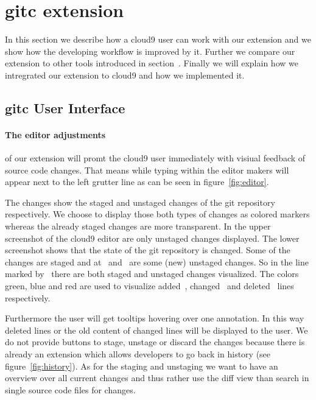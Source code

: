\section{gitc extension}
\label{sec:Extension}
In this section we describe how a cloud9 user can work with our extension and we show how the developing workflow is improved by it.
Further we compare our extension to other tools introduced in section~.
Finally we will explain how we intregrated our extension to cloud9 and how we implemented it.

\subsection{gitc User Interface}
\label{sec:gitc_ui}
\paragraph{The editor adjustments} of our extension will promt the cloud9 user immediately with visiual feedback of source code changes.
That means while typing within the editor makers will appear next to the left grutter line as can be seen in figure~\ref{fig:editor}.

The changes show the staged and unstaged changes of the git repository respectively.
We choose to display those both types of changes as colored markers whereas the already staged changes are more transparent.
In the upper screenshot of the cloud9 editor are only unstaged changes displayed.
The lower screenshot shows that the state of the git repository is changed.
Some of the changes are staged and at~ and~ are some (new) unstaged changes.
So in the line marked by~ there are both staged and unstaged changes visualized.
The colors green, blue and red are used to visualize added~, changed~ and deleted~ lines respectively.

Furthermore the user will get tooltips hovering over one annotation.
In this way deleted lines or the old content of changed lines will be displayed to the user.
We do not provide buttons to stage, unstage or discard the changes because there is already an extension which allows developers to go back in history (see figure~\ref{fig:history}).
As for the staging and unstaging we want to have an overview over all current changes and thus rather use the diff view than search in single source code files for changes.

